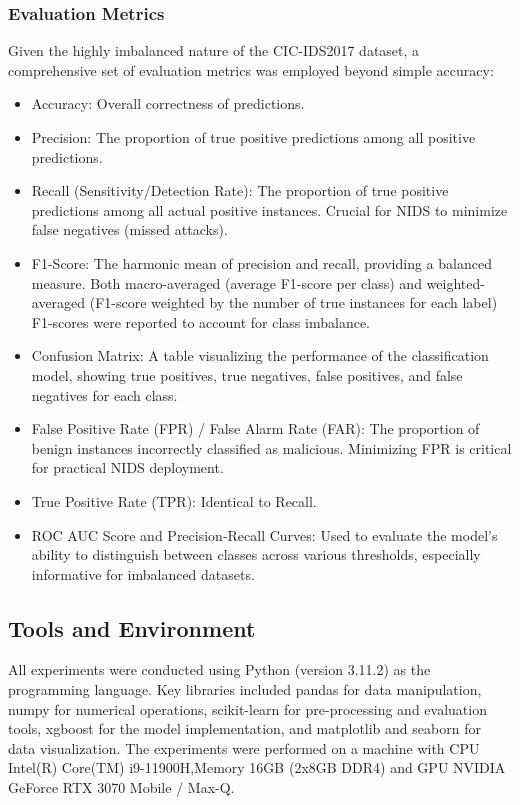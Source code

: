 \subsubsection{Evaluation Metrics}
Given the highly imbalanced nature of the CIC-IDS2017 dataset, a comprehensive set of evaluation metrics was employed beyond simple accuracy:
\begin{itemize}
	\item Accuracy: Overall correctness of predictions.
	\item Precision: The proportion of true positive predictions among all positive predictions.
	\item  Recall (Sensitivity/Detection Rate): The proportion of true positive predictions among all actual positive instances. Crucial for NIDS to minimize false negatives (missed attacks).
	\item F1-Score: The harmonic mean of precision and recall, providing a balanced measure. Both macro-averaged (average F1-score per class) and weighted-averaged (F1-score weighted by the number of true instances for each label) F1-scores were reported to account for class imbalance.
	\item Confusion Matrix: A table visualizing the performance of the classification model, showing true positives, true negatives, false positives, and false negatives for each class.
	\item False Positive Rate (FPR) / False Alarm Rate (FAR): The proportion of benign instances incorrectly classified as malicious. Minimizing FPR is critical for practical NIDS deployment.
	\item True Positive Rate (TPR): Identical to Recall.
	\item ROC AUC Score and Precision-Recall Curves: Used to evaluate the model's ability to distinguish between classes across various thresholds, especially informative for imbalanced datasets.
\end{itemize}

\subsection{Tools and Environment}
All experiments were conducted using Python (version 3.11.2) as the programming language. Key libraries included pandas for data manipulation, numpy for numerical operations, scikit-learn for pre-processing and evaluation tools, xgboost for the model implementation, and matplotlib and seaborn for data visualization. The experiments were performed on a machine with CPU Intel(R) Core(TM) i9-11900H,Memory 16GB (2x8GB DDR4) and GPU NVIDIA GeForce RTX 3070 Mobile / Max-Q.

